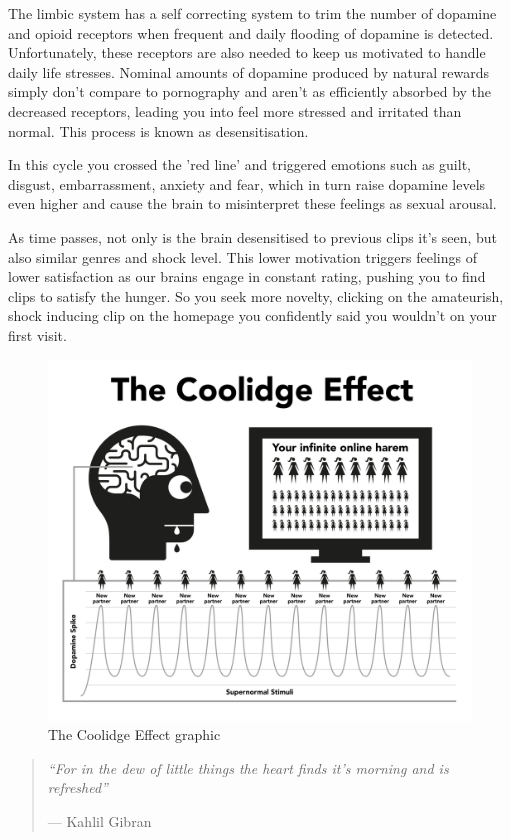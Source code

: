 \documentclass[
]{book}
\begin{document}
The limbic system has a self correcting system to trim the number of dopamine and opioid receptors when frequent and daily flooding of dopamine is detected. Unfortunately, these receptors are also needed to keep us motivated to handle daily life stresses. Nominal amounts of dopamine produced by natural rewards simply don't compare to pornography and aren't as efficiently absorbed by the decreased receptors, leading you into feel more stressed and irritated than normal. This process is known as desensitisation.

In this cycle you crossed the 'red line' and triggered emotions such as guilt, disgust, embarrassment, anxiety and fear, which in turn raise dopamine levels even higher and cause the brain to misinterpret these feelings as sexual arousal.

As time passes, not only is the brain desensitised to previous clips it's seen, but also similar genres and shock level. This lower motivation triggers feelings of lower satisfaction as our brains engage in constant rating, pushing you to find clips to satisfy the hunger. So you seek more novelty, clicking on the amateurish, shock inducing clip on the homepage you confidently said you wouldn't on your first visit.

\begin{figure}
\centering
\includegraphics{images/coolidge.png}
\caption{The Coolidge Effect graphic}
\end{figure}

\begin{quote}
\emph{``For in the dew of little things the heart finds it's morning and is refreshed''}

--- Kahlil Gibran
\end{quote}
\end{document}
